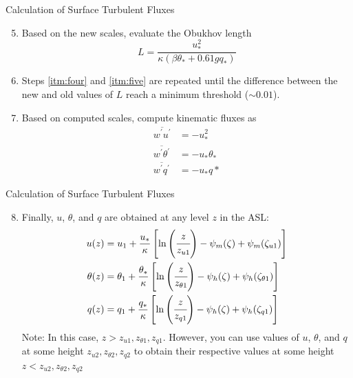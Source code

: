 \begin{frame}{Calculation of Surface Turbulent Fluxes}
\begin{enumerate}
\setcounter{enumi}{4}
	\item \label{itm:five} Based on the new scales, evaluate the Obukhov length
	$$L = \frac{u_*^2}{\kappa(\beta \theta_* + 0.61 g q_*)}$$
	\item Steps \ref{itm:four} and \ref{itm:five} are repeated until the difference between the new and old values of $L$ reach a minimum threshold ($\sim 0.01$).
	\item Based on computed scales, compute kinematic fluxes as
	\begin{align*}
		\overline{w^\prime u^\prime} &= -u_*^2\\
		\overline{w^\prime \theta^\prime} &= -u_*\theta_*\\
		\overline{w^\prime q^\prime} &= -u_*q*
	\end{align*}
\end{enumerate}
\end{frame}
\begin{frame}{Calculation of Surface Turbulent Fluxes}
\begin{enumerate}
\setcounter{enumi}{7}
	\item Finally, $u$, $\theta$, and $q$ are obtained at any level $z$ in the ASL:
	\begin{align*}
	u(z) &= u_1+ \frac{u_*}{\kappa}\left[\ln \left(\cfrac{z}{z_{u1}}\right) - \psi_m(\zeta) + \psi_m(\zeta_{u1})\right]\\
	\theta(z) &= \theta_1+ \frac{\theta_*}{\kappa}\left[\ln \left(\cfrac{z}{z_{\theta 1}}\right) - \psi_h(\zeta) + \psi_h(\zeta_{\theta 1})\right]\\
	q(z) &= q_1+ \frac{q_*}{\kappa}\left[\ln \left(\cfrac{z}{z_{q1}}\right) - \psi_h(\zeta) + \psi_h(\zeta_{q1})\right]	
	\end{align*}
	Note: In this case, $z>z_{u1},z_{\theta 1},z_{q1}$. However, you can use values of $u$, $\theta$, and $q$ at some height $z_{u2},z_{\theta 2},z_{q2}$ to obtain their respective values at some height $z<z_{u2},z_{\theta 2},z_{q2}$
\end{enumerate}
\end{frame}


